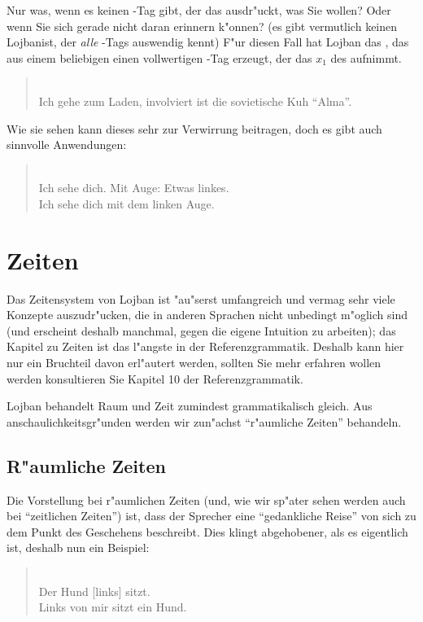 Nur was, wenn es keinen -Tag gibt, der das ausdr"uckt, was Sie wollen? Oder wenn Sie sich gerade nicht daran erinnern k"onnen? (es gibt
vermutlich keinen Lojbanist, der \emph{alle} -Tags auswendig kennt)
F"ur diesen Fall hat Lojban das  , das aus einem beliebigen  einen vollwertigen -Tag erzeugt, der das $x_1$ des  aufnimmt.
\begin{quote}
 \\
Ich gehe zum Laden, involviert ist die sovietische Kuh ``Alma''.
\end{quote}
Wie sie sehen kann dieses  sehr zur Verwirrung beitragen, doch es gibt auch sinnvolle Anwendungen:
\begin{quote}
 \\
Ich sehe dich. Mit Auge: Etwas linkes. \\
Ich sehe dich mit dem linken Auge.
\end{quote}

\section{Zeiten}
Das Zeitensystem von Lojban ist "au"serst umfangreich und vermag sehr viele Konzepte auszudr"ucken, die in anderen Sprachen nicht unbedingt
m"oglich sind (und erscheint deshalb manchmal, gegen die eigene Intuition zu arbeiten); das Kapitel zu Zeiten ist das l"angste in der
Referenzgrammatik. Deshalb kann hier nur ein Bruchteil davon erl"autert werden, sollten Sie mehr erfahren wollen werden konsultieren Sie Kapitel
10 der Referenzgrammatik.

Lojban behandelt Raum und Zeit zumindest grammatikalisch gleich. Aus anschaulichkeitsgr"unden werden wir zun"achst ``r"aumliche Zeiten'' behandeln.

\subsection{R"aumliche Zeiten}
Die Vorstellung bei r"aumlichen Zeiten (und, wie wir sp"ater sehen werden auch bei ``zeitlichen Zeiten'') ist, dass der Sprecher eine ``gedankliche Reise'' von sich zu dem Punkt des Geschehens beschreibt.
Dies klingt abgehobener, als es eigentlich ist, deshalb nun ein Beispiel:
\begin{quote}
 \\
Der Hund [links] sitzt.\\
Links von mir sitzt ein Hund.
\end{quote}

